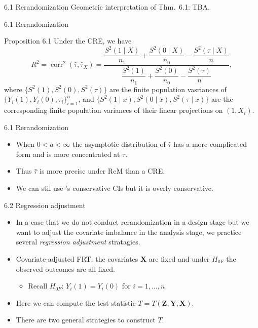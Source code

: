 \documentclass[aspectratio=169, 12pt]{beamer}
\begin{document}
\begin{frame}{6.1 Rerandomization}
  Geometric interpretation of Thm.~6.1: TBA.
\end{frame}

\begin{frame}[label=prop-6-1]{6.1 Rerandomization}
  \begin{keybox}{Proposition 6.1}
    Under the CRE, we have
    \[
    R^2 = \operatorname{corr}^2(\widehat{\tau}, \widehat{\tau}_X) = \frac{\dfrac{S^2(1\mid X)}{n_1} + \dfrac{S^2(0\mid X)}{n_0} - \dfrac{S^2(\tau \mid X)}{n}}{\dfrac{S^2(1)}{n_1} + \dfrac{S^2(0)}{n_0} - \dfrac{S^2(\tau)}{n}},
    \]
    where $\{S^2(1), S^2(0), S^2(\tau)\}$ are the finite population vasriances of $\{Y_i(1),Y_i(0), \tau_i\}_{i=1}^{n}$, and $\{S^2(1\mid x), S^2(0 \mid x), S^2(\tau\mid x)\}$ are the corresponding finite population variances of their linear projections on $(1,X_i)$. 
    \vfill
    \hfill\hyperlink{pf-prop-6-1<1>}{}
  \end{keybox}
\end{frame}

\begin{frame}{6.1 Rerandomization}
  \begin{itemize}
    \item When $0<a<\infty$ the asymptotic distribution of $\widehat{\tau}$ has a more complicated form and is more concentrated at $\tau$.
    \item Thus $\widehat{\tau}$ is more precise under ReM than a CRE.
    \item We can stil use \citet{neyman1923application}'s conservative CIs but it is overly conservative.
  \end{itemize}
\end{frame}

\begin{frame}{6.2 Regression adjustment}
  \begin{itemize}
    \item In a case that we do not conduct rerandomization in a design stage but we want to adjust the covariate imbalance in the analysis stage, we practice several \textit{regression adjustment} stratagies.
    \item Covariate-adjusted FRT: the covariates $\bm{X}$ are fixed and under $H_{0F}$ the observed outcomes are all fixed.
    \begin{itemize}
      \item Recall $H_{0F}$: $Y_i(1)=Y_i(0)$ for $i=1,\dots,n$.
    \end{itemize}
    \item Here we can compute the test statistic $T = T(\bm{Z},\bm{Y},\bm{X})$.
    \item There are two general strategies to construct $T$.
  \end{itemize}
\end{frame}
\end{document}
